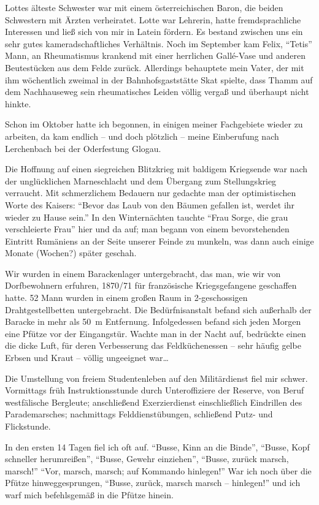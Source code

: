 Lottes älteste Schwester war mit einem österreichischen Baron, die beiden Schwestern mit Ärzten verheiratet. Lotte war Lehrerin, hatte fremdsprachliche Interessen und ließ sich von mir in Latein fördern. Es bestand zwischen uns ein sehr gutes kameradschaftliches Verhältnis. Noch im September kam Felix, \enquote{Tetis} Mann, an Rheumatismus krankend mit einer herrlichen Gallé-Vase und anderen Beutestücken aus dem Felde zurück. Allerdings behauptete mein Vater, der mit ihm wöchentlich zweimal in der Bahnhofsgaststätte Skat spielte, dass Thamm auf dem Nachhauseweg sein rheumatisches Leiden völlig vergaß und überhaupt nicht hinkte.

Schon im Oktober hatte ich begonnen, in einigen meiner Fachgebiete wieder zu arbeiten, da kam endlich -- und doch plötzlich -- meine Einberufung nach Lerchenbach bei der Oderfestung Glogau.

Die Hoffnung auf einen siegreichen Blitzkrieg mit baldigem Kriegsende war nach der unglücklichen Marneschlacht und dem Übergang zum Stellungskrieg verraucht. Mit schmerzlichem Bedauern nur gedachte man der optimistischen Worte des Kaisers: \enquote{Bevor das Laub von den Bäumen gefallen ist, werdet ihr wieder zu Hause sein.} In den Winternächten tauchte \enquote{Frau Sorge, die grau verschleierte Frau} hier und da auf; man begann von einem bevorstehenden Eintritt Rumäniens an der Seite unserer Feinde zu munkeln, was dann auch einige Monate (Wochen?) später geschah.

Wir wurden in einem Barackenlager untergebracht, das man, wie wir von Dorfbewohnern erfuhren, 1870/71 für französische Kriegsgefangene geschaffen hatte. 52 Mann wurden in einem großen Raum in 2-geschossigen Drahtgestellbetten untergebracht. Die Bedürfnisanstalt befand sich außerhalb der Baracke in mehr als 50~m Entfernung. Infolgedessen befand sich jeden Morgen eine Pfütze vor der Eingangstür. Wachte man in der Nacht auf, bedrückte einen die dicke Luft, für deren Verbesserung das Feldküchenessen -- sehr häufig gelbe Erbsen und Kraut -- völlig ungeeignet war\dots

Die Umstellung von freiem Studentenleben auf den Militärdienst fiel mir schwer. Vormittags früh Instruktionsstunde durch Unteroffiziere der Reserve, von Beruf westfälische Bergleute; anschließend Exerzierdienst einschließlich Eindrillen des Parademarsches; nachmittags Felddienstübungen, schließend Putz- und Flickstunde.

In den ersten 14 Tagen fiel ich oft auf. \enquote{Busse, Kinn an die Binde}, \enquote{Busse, Kopf schneller herumreißen}, \enquote{Busse, Gewehr einziehen}, \enquote{Busse, zurück marsch, marsch!} \enquote{Vor, marsch, marsch; auf Kommando hinlegen!} War ich noch über die Pfütze hinweggesprungen, \enquote{Busse, zurück, marsch marsch -- hinlegen!} und ich warf mich befehlsgemäß in die Pfütze hinein.


